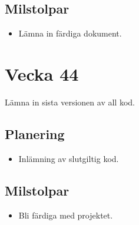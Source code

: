 \documentclass{TDP003mall}
\begin{document}
\subsection{Milstolpar}
\begin{itemize}
\item Lämna in färdiga dokument.
\end{itemize}

\section{Vecka 44}
Lämna in sista versionen av all kod.\\

\subsection{Planering}
\begin{itemize}
\item Inlämning av slutgiltig kod. 
\end{itemize}

\subsection{Milstolpar}
\begin{itemize}
\item Bli färdiga med projektet.
\end{itemize} 
\end{document}
